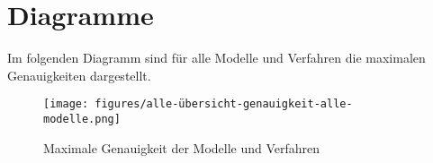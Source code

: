 \section{Diagramme}

Im folgenden Diagramm sind für alle Modelle und Verfahren die maximalen Genauigkeiten dargestellt.

\begin{figure}[H]
    \centering
    \texttt{[image: figures/alle-übersicht-genauigkeit-alle-modelle.png]}
    \caption{Maximale Genauigkeit der Modelle und Verfahren}
    \label{fig:results}
\end{figure}
